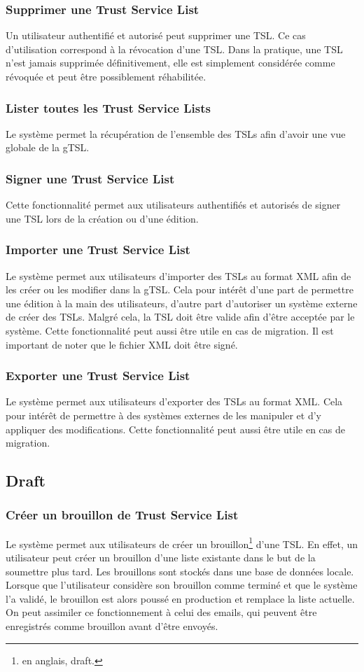 \documentclass{tnreport}
\begin{document}
\subsubsection{Supprimer une Trust Service List}
Un utilisateur authentifié et autorisé peut supprimer une TSL. Ce cas d'utilisation correspond à la révocation d'une TSL. Dans la pratique, une TSL n'est jamais supprimée définitivement, elle est simplement considérée comme révoquée et peut être possiblement réhabilitée.
\subsubsection{Lister toutes les Trust Service Lists}
Le système permet la récupération de l'ensemble des TSLs afin d'avoir une vue globale de la gTSL.
\subsubsection{Signer une Trust Service List}
Cette fonctionnalité permet aux utilisateurs authentifiés et autorisés de signer une TSL lors de la création ou d'une édition.
\subsubsection{Importer une Trust Service List}
Le système permet aux utilisateurs d'importer des TSLs au format XML afin de les créer ou les modifier dans la gTSL. Cela pour intérêt d'une part de permettre une édition à la main des utilisateurs, d'autre part d'autoriser un système externe de créer des TSLs. Malgré cela, la TSL doit être valide afin d'être acceptée par le système. Cette fonctionnalité peut aussi être utile en cas de migration. Il est important de noter que le fichier XML doit être signé.
\subsubsection{Exporter une Trust Service List}
Le système permet aux utilisateurs d'exporter des TSLs au format XML. Cela pour intérêt de permettre à des systèmes externes de les manipuler et d'y appliquer des modifications. Cette fonctionnalité peut aussi être utile en cas de migration.

\subsection{Draft}
\subsubsection{Créer un brouillon de Trust Service List}
Le système permet aux utilisateurs de créer un brouillon\footnote{en anglais, draft.} d'une TSL. En effet, un utilisateur peut créer un brouillon d'une liste existante dans le but de la soumettre plus tard. Les brouillons sont stockés dans une base de données locale. Lorsque que l'utilisateur considère son brouillon comme terminé et que le système l'a validé, le brouillon est alors poussé en production et remplace la liste actuelle. On peut assimiler ce fonctionnement à celui des emails, qui peuvent être enregistrés comme brouillon avant d'être envoyés.
\end{document}
